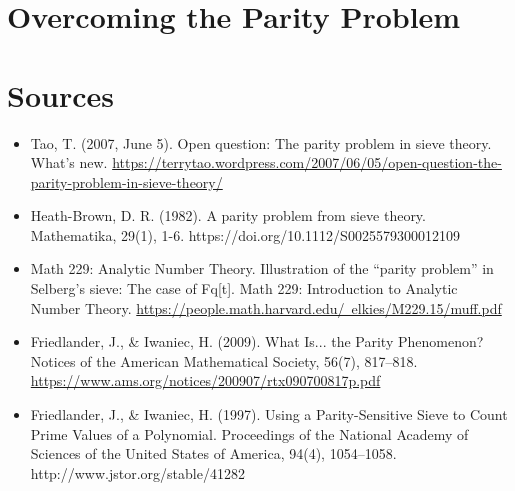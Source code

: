 \documentclass[10pt]{extarticle}
\begin{document}
\pagebreak
\section{Overcoming the Parity Problem}














\pagebreak
\section{Sources}
\begin{itemize}
  \item Tao, T. (2007, June 5). Open question: The parity problem in sieve theory. What's new. \href{https://terrytao.wordpress.com/2007/06/05/open-question-the-parity-problem-in-sieve-theory/}{https://terrytao.wordpress.com/2007/06/05/open-question-the-parity-problem-in-sieve-theory/}
  \item Heath-Brown, D. R. (1982). A parity problem from sieve theory. Mathematika, 29(1), 1-6. https://doi.org/10.1112/S0025579300012109
  \item Math 229: Analytic Number Theory. Illustration of the “parity problem” in Selberg’s sieve: The case of Fq[t]. Math 229: Introduction to Analytic Number Theory. \href{https://people.math.harvard.edu/~elkies/M229.15/muff.pdf}{https://people.math.harvard.edu/~elkies/M229.15/muff.pdf}
  \item Friedlander, J., \& Iwaniec, H. (2009). What Is... the Parity Phenomenon? Notices of the American Mathematical Society, 56(7), 817–818. \href{https://www.ams.org/notices/200907/rtx090700817p.pdf}{https://www.ams.org/notices/200907/rtx090700817p.pdf}
  \item Friedlander, J., \& Iwaniec, H. (1997). Using a Parity-Sensitive Sieve to Count Prime Values of a Polynomial. Proceedings of the National Academy of Sciences of the United States of America, 94(4), 1054–1058. http://www.jstor.org/stable/41282
  \end{itemize}
\end{document}
